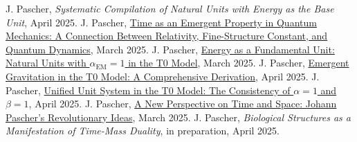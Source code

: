 \documentclass[12pt,a4paper]{article}
\newcommand{\alphaEM}{\alpha_{\text{EM}}}
\begin{document}
	
	\begin{thebibliography}{99}
		 J. Pascher, \textit{Systematic Compilation of Natural Units with Energy as the Base Unit}, April 2025.
		 J. Pascher, \href{https://github.com/jpascher/T0-Time-Mass-Duality/tree/main/2/pdf/English/ZeitEmergentQMEn.pdf}{Time as an Emergent Property in Quantum Mechanics: A Connection Between Relativity, Fine-Structure Constant, and Quantum Dynamics}, March 2025.
		 J. Pascher, \href{https://github.com/jpascher/T0-Time-Mass-Duality/tree/main/2/pdf/English/NatEinheitenAlpha1En.pdf}{Energy as a Fundamental Unit: Natural Units with $\alphaEM = 1$ in the T0 Model}, March 2025.
		 J. Pascher, \href{https://github.com/jpascher/T0-Time-Mass-Duality/tree/main/2/pdf/English/EmergentGravT0En.pdf}{Emergent Gravitation in the T0 Model: A Comprehensive Derivation}, April 2025.
		 J. Pascher, \href{https://github.com/jpascher/T0-Time-Mass-Duality/tree/main/2/pdf/English/Alpha1Beta1KonsistenzEn.pdf}{Unified Unit System in the T0 Model: The Consistency of $\alpha = 1$ and $\beta = 1$}, April 2025.
		 J. Pascher, \href{https://github.com/jpascher/T0-Time-Mass-Duality/tree/main/2/pdf/English/ZeitRaumPascherEn.pdf}{A New Perspective on Time and Space: Johann Pascher’s Revolutionary Ideas}, March 2025.
		 J. Pascher, \textit{Biological Structures as a Manifestation of Time-Mass Duality}, in preparation, April 2025.
	\end{thebibliography}
	
\end{document}

